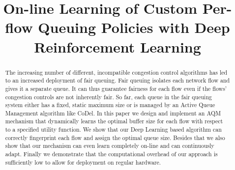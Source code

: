 \documentclass[10pt,sigconf,letterpaper,anonymous]{acmart}
\begin{document}
\title{On-line Learning of Custom Per-flow Queuing Policies with Deep Reinforcement Learning}



\begin{abstract}
The increasing number of different, incompatible congestion control algorithms has led to an increased deployment of fair queuing. Fair queuing isolates each network flow and gives it a separate queue. It can thus guarantee fairness for each flow even if the flows' congestion controls are not inherently fair. So far, each queue in the fair queuing system either has a fixed, static maximum size or is managed by an Active Queue Management algorithm like CoDel. In this paper we design and implement an AQM mechanism that dynamically learns the optimal buffer size for each flow with respect to a specified utility function. We show that our Deep Learning based algorithm can correctly fingerprint each flow and assign the optimal queue size. Besides that we also show that our mechanism can even learn completely on-line and can continuously adapt. Finally we demonstrate that the computational overhead of our approach is sufficiently low to allow for deployment on regular hardware. 
\end{abstract}

\maketitle



\end{document}
